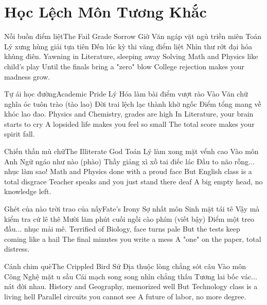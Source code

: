 \chapter{Học Lệch Môn Tương Khắc}

\begin{tutuyetbox}{Nỗi buồn điểm liệt}{The Fail Grade Sorrow}
Giờ Văn ngáp vặt ngủ triền miên
Toán Lý xưng hùng giải tựa tiên
Đến lúc kỳ thi văng điểm liệt
Nhìn thư rớt đại hóa khùng điên.
\tcblower
Yawning in Literature, sleeping away 
Solving Math and Physics like child's play 
Until the finals bring a "zero" blow 
College rejection makes your madness grow.
\end{tutuyetbox}

\begin{tutuyetbox}{Tự ái học đường}{Academic Pride}
Lý Hóa làm bài điểm vượt rào
Vào Văn chữ nghĩa óc tuôn trào (tào lao)
Đời trai lệch lạc thành khờ ngốc
Điểm tổng mang về khóc lao đao.
\tcblower
Physics and Chemistry, grades are high 
In Literature, your brain starts to cry 
A lopsided life makes you feel so small 
The total score makes your spirit fall.
\end{tutuyetbox}

\begin{tutuyetbox}{Chiến thần mù chữ}{The Illiterate God}
Toán Lý làm xong mặt vểnh cao
Vào môn Anh Ngữ ngáo như nào (phào)
Thầy giảng xì xồ tai điếc lác
Đầu to não rỗng... nhục làm sao!
\tcblower
Math and Physics done with a proud face
But English class is a total disgrace
Teacher speaks and you just stand there deaf
A big empty head, no knowledge left.
\end{tutuyetbox}

\begin{tutuyetbox}{Ghét của nào trời trao của nấy}{Fate's Irony}
Sợ nhất môn Sinh mặt tái tê
Vậy mà kiểm tra cứ lê thê
Mười lăm phút cuối ngồi cào phím (viết bậy)
Điểm một treo đầu... nhục mải mê.
\tcblower
Terrified of Biology, face turns pale
But the tests keep coming like a hail
The final minutes you write a mess
A "one" on the paper, total distress.
\end{tutuyetbox}

\begin{tutuyetbox}{Cánh chim què}{The Crippled Bird}
Sử Địa thuộc lòng chẳng sót câu
Vào môn Công Nghệ mặt u sầu
Cái mạch song song nhìn chẳng thấu
Tương lai bốc vác... nát đời nhau.
\tcblower
History and Geography, memorized well
But Technology class is a living hell
Parallel circuits you cannot see
A future of labor, no more degree.
\end{tutuyetbox}

